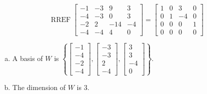 \begin{exerciseAnswer} 


\[\operatorname{RREF} \left[\begin{array}{cccc}
-1 & -3 & 9 & 3 \\
-4 & -3 & 0 & 3 \\
-2 & 2 & -14 & -4 \\
-4 & -4 & 4 & 0
\end{array}\right] = \left[\begin{array}{cccc}
1 & 0 & 3 & 0 \\
0 & 1 & -4 & 0 \\
0 & 0 & 0 & 1 \\
0 & 0 & 0 & 0
\end{array}\right] \]


\begin{enumerate}[(a)]
\item A basis of \(W\) is \( \left\{ \left[\begin{array}{c}
-1 \\
-4 \\
-2 \\
-4
\end{array}\right] , \left[\begin{array}{c}
-3 \\
-3 \\
2 \\
-4
\end{array}\right] , \left[\begin{array}{c}
3 \\
3 \\
-4 \\
0
\end{array}\right] \right\} \).
\item The dimension of \(W\) is \( 3 \).
\end{enumerate}
    
\end{exerciseAnswer}
    
